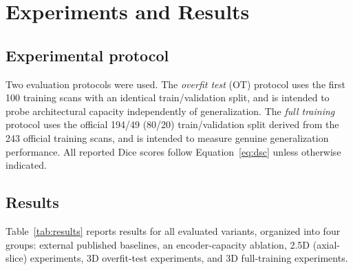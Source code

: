 \documentclass[preprint,12pt,3p]{elsarticle}
\begin{document}
\section{Experiments and Results}
\label{sec:results}

\subsection{Experimental protocol}
Two evaluation protocols were used. The \emph{overfit test} (OT) protocol uses the first 100 training scans with an identical train/validation split, and is intended to probe architectural capacity independently of generalization. The \emph{full training} protocol uses the official 194/49 (80/20) train/validation split derived from the 243 official training scans, and is intended to measure genuine generalization performance. All reported Dice scores follow Equation~\ref{eq:dsc} unless otherwise indicated.

\subsection{Results}
Table~\ref{tab:results} reports results for all evaluated variants, organized into four groups: external published baselines, an encoder-capacity ablation, 2.5D (axial-slice) experiments, 3D overfit-test experiments, and 3D full-training experiments.
\end{document}

